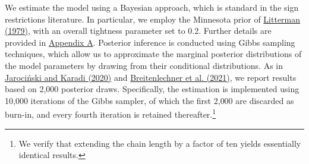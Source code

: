 \documentclass[12pt, reqno]{article}
\begin{document}
We estimate the model using a Bayesian approach, which is standard in the sign restrictions literature. In particular, we employ the Minnesota prior of \hyperlink{Litterman (1979)}{Litterman (1979)}, with an overall tightness parameter set to 0.2. Further details are provided in \hyperlink{Appendix A}{Appendix A}. Posterior inference is conducted using Gibbs sampling techniques, which allow us to approximate the marginal posterior distributions of the model parameters by drawing from their conditional distributions. As in \hyperlink{JK (2020)}{Jarociński and Karadi (2020)} and \hyperlink{Breitenlechner (2021)}{Breitenlechner et al. (2021)}, we report results based on 2{,}000 posterior draws. Specifically, the estimation is implemented using 10{,}000 iterations of the Gibbs sampler, of which the first 2{,}000 are discarded as burn-in, and every fourth iteration is retained thereafter.\footnote{We verify that extending the chain length by a factor of ten yields essentially identical results.}
\end{document}
